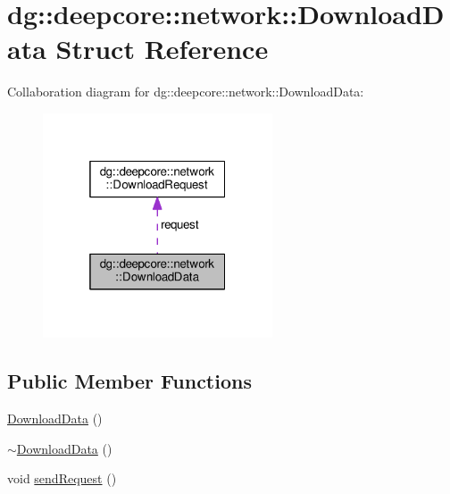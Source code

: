 \hypertarget{structdg_1_1deepcore_1_1network_1_1_download_data}{}\section{dg\+:\+:deepcore\+:\+:network\+:\+:Download\+Data Struct Reference}
\label{structdg_1_1deepcore_1_1network_1_1_download_data}


Collaboration diagram for dg\+:\+:deepcore\+:\+:network\+:\+:Download\+Data\+:
\nopagebreak
\begin{figure}[H]
\begin{center}
\leavevmode
\includegraphics[width=193pt]{structdg_1_1deepcore_1_1network_1_1_download_data__coll__graph}
\end{center}
\end{figure}
\subsection*{Public Member Functions}
\begin{DoxyCompactItemize}
\item 
\hyperlink{structdg_1_1deepcore_1_1network_1_1_download_data_ac04e654bffde01b5b0701d617bbae59c}{Download\+Data} ()
\item 
\hyperlink{structdg_1_1deepcore_1_1network_1_1_download_data_aab6801db8554507cdd5752d943e6701d}{$\sim$\+Download\+Data} ()
\item 
void \hyperlink{structdg_1_1deepcore_1_1network_1_1_download_data_a7540a749fcfe1012a4b98387e3f04c8c}{send\+Request} ()
\end{DoxyCompactItemize}
